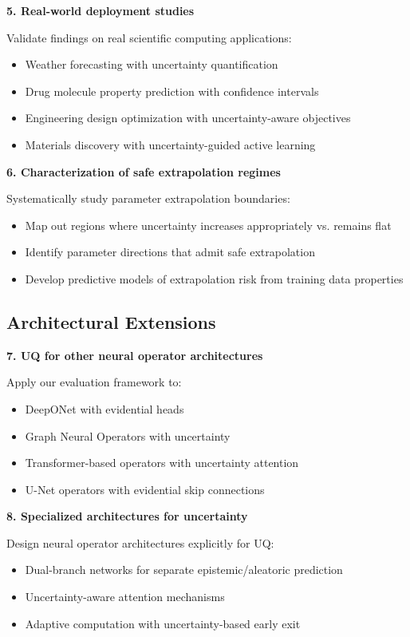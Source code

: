 \textbf{5. Real-world deployment studies}

Validate findings on real scientific computing applications:
\begin{itemize}
\item Weather forecasting \cite{weyn2020improving} with uncertainty quantification
\item Drug molecule property prediction with confidence intervals
\item Engineering design optimization with uncertainty-aware objectives
\item Materials discovery with uncertainty-guided active learning \cite{settles2009active}
\end{itemize}

\textbf{6. Characterization of safe extrapolation regimes}

Systematically study parameter extrapolation boundaries:
\begin{itemize}
\item Map out regions where uncertainty increases appropriately vs. remains flat
\item Identify parameter directions that admit safe extrapolation
\item Develop predictive models of extrapolation risk from training data properties
\end{itemize}

\subsection{Architectural Extensions}

\textbf{7. UQ for other neural operator architectures}

Apply our evaluation framework to:
\begin{itemize}
\item DeepONet \cite{lu2021deeponet} with evidential heads
\item Graph Neural Operators \cite{li2020graph} with uncertainty
\item Transformer-based operators with uncertainty attention
\item U-Net operators with evidential skip connections
\end{itemize}

\textbf{8. Specialized architectures for uncertainty}

Design neural operator architectures explicitly for UQ:
\begin{itemize}
\item Dual-branch networks for separate epistemic/aleatoric prediction
\item Uncertainty-aware attention mechanisms
\item Adaptive computation with uncertainty-based early exit
\end{itemize}

